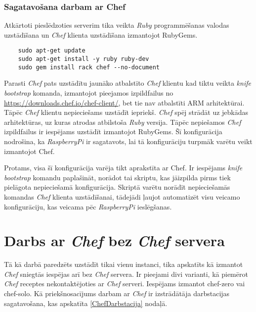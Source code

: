 \subsubsection{Sagatavošana darbam ar Chef}
Atkārtoti pieslēdzoties serverim tika veikta \textit{Ruby} programmēšanas valodas uzstādīšana un \textit{Chef} klienta uzstādīšana izmantojot RubyGems.
\begin{lstlisting}
	sudo apt-get update
	sudo apt-get install -y ruby ruby-dev
	sudo gem install rack chef --no-document
\end{lstlisting}
Parasti \textit{Chef} pats uzstādītu jaunāko atbalstīto \textit{Chef} klientu kad tiktu veikta \textit{knife bootstrap} komanda, izmantojot pieejamos izpildfailus no \url{https://downloads.chef.io/chef-client/}, bet tie nav atbalstīti ARM arhitektūrai. Tāpēc \textit{Chef} klientu nepieciešams uzstādīt iepriekš. \textit{Chef} spēj strādāt uz jebkādas arhitektūras, uz kuras atrodas atbilstoša \textit{Ruby} versija. Tāpēc nepiešamos \textit{Chef} izpildfailus ir iespējams uzstādīt izmantojot RubyGems. Šī konfigurācija nodrošina, ka \textit{RaspberryPi} ir sagatavots, lai tā konfigurāciju turpmāk varētu veikt izmantojot Chef.

Protams, visa šī konfigurācija varēja tikt aprakstīta ar Chef. Ir iespējams \textit{knife bootstrap} komandu paplašināt, norādot tai skriptu, kas jāizpilda pirms tiek pielāgota nepieciešamā konfigurācija. Skriptā varētu norādīt nepieciešamās komandas \textit{Chef} klienta uzstādīšanai, tādejādi ļaujot automatizēt visu veicamo konfigurāciju, kas veicama pēc \textit{RaspberryPi} ieslēgšanas.


\section{Darbs ar \textit{Chef} bez \textit{Chef} servera}
Tā kā darbā paredzēts uzstādīt tikai vienu instanci, tika apskatīts kā izmantot \textit{Chef} sniegtās iespējas arī bez \textit{Chef} servera. Ir pieejami divi varianti, kā piemērot \textit{Chef} receptes nekontaktējoties ar \textit{Chef} serveri. Iespējams izmantot chef-zero vai chef-solo.
Kā priekšnosacījums darbam ar \textit{Chef} ir izstrādātāja darbstacijas sagatavošana, kas apskatīta \ref{ChefDarbstacija} nodaļā.
